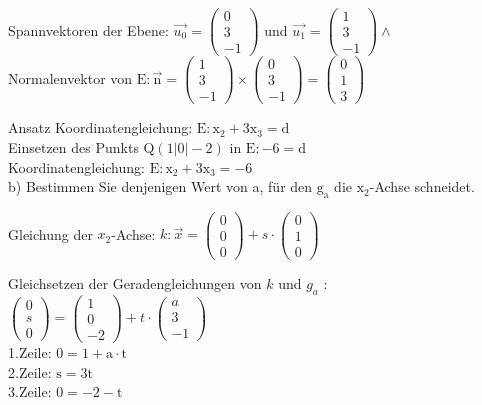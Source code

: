 \documentclass[10pt]{article}
\begin{document}
Spannvektoren der Ebene: $\overrightarrow{u_{0}}=\left(\begin{array}{c}0 \\ 3 \\ -1\end{array}\right)$ und $\overrightarrow{u_{1}}=\left(\begin{array}{c}1 \\ 3 \\ -1\end{array}\right) \wedge$\\
Normalenvektor von $\mathrm{E}: \overrightarrow{\mathrm{n}}=\left(\begin{array}{c}1 \\ 3 \\ -1\end{array}\right) \times\left(\begin{array}{c}0 \\ 3 \\ -1\end{array}\right)=\left(\begin{array}{l}0 \\ 1 \\ 3\end{array}\right)$

Ansatz Koordinatengleichung: $\mathrm{E}: \mathrm{x}_{2}+3 \mathrm{x}_{3}=\mathrm{d}$\\
Einsetzen des Punkts $\mathrm{Q}(1|0|-2)$ in $\mathrm{E}:-6=\mathrm{d}$\\
Koordinatengleichung: $\mathrm{E}: \mathrm{x}_{2}+3 \mathrm{x}_{3}=-6$\\
b) Bestimmen Sie denjenigen Wert von a, für den $\mathrm{g}_{\mathrm{a}}$ die $\mathrm{x}_{2}$-Achse schneidet.

Gleichung der $x_{2}$-Achse: $k: \vec{x}=\left(\begin{array}{l}0 \\ 0 \\ 0\end{array}\right)+s \cdot\left(\begin{array}{l}0 \\ 1 \\ 0\end{array}\right)$

Gleichsetzen der Geradengleichungen von $k$ und $g_{a}$ :\\
$\left(\begin{array}{l}0 \\ s \\ 0\end{array}\right)=\left(\begin{array}{c}1 \\ 0 \\ -2\end{array}\right)+t \cdot\left(\begin{array}{c}a \\ 3 \\ -1\end{array}\right)$\\
1.Zeile: $0=1+\mathrm{a} \cdot \mathrm{t}$\\
2.Zeile: $\mathrm{s}=3 \mathrm{t}$\\
3.Zeile: $0=-2-\mathrm{t}$
\end{document}

